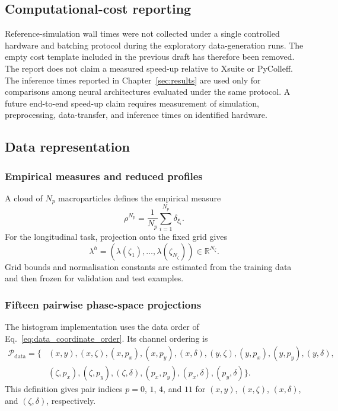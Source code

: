 \subsection{Computational-cost reporting}

Reference-simulation wall times were not collected under a single controlled hardware and batching protocol during the exploratory data-generation runs. The empty cost template included in the previous draft has therefore been removed. The report does not claim a measured speed-up relative to Xsuite or PyColleff. The inference times reported in Chapter~\ref{sec:results} are used only for comparisons among neural architectures evaluated under the same protocol. A future end-to-end speed-up claim requires measurement of simulation, preprocessing, data-transfer, and inference times on identified hardware.

\subsection{Data representation}

\subsubsection{Empirical measures and reduced profiles}

A cloud of $N_p$ macroparticles defines the empirical measure
\begin{equation}
    \rho^{N_p}
    =
    \frac{1}{N_p}
    \sum_{i=1}^{N_p}\delta_{\xi_i}.
\end{equation}
For the longitudinal task, projection onto the fixed grid gives
\begin{equation}
    \lambda^h
    =
    \left(
        \lambda(\zeta_1),\ldots,\lambda(\zeta_{N_{\zeta}})
    \right)
    \in
    \mathbb{R}^{N_{\zeta}}.
\end{equation}
Grid bounds and normalisation constants are estimated from the training data and then frozen for validation and test examples.

\subsubsection{Fifteen pairwise phase-space projections}

The histogram implementation uses the data order of Eq.~\eqref{eq:data_coordinate_order}. Its channel ordering is
\begin{align}
    \mathcal{P}_{\mathrm{data}}
    =\{&
    (x,y),
    (x,\zeta),
    (x,p_x),
    (x,p_y),
    (x,\delta),
    (y,\zeta),
    (y,p_x),
    (y,p_y),
    (y,\delta),
    \nonumber\\
    &
    (\zeta,p_x),
    (\zeta,p_y),
    (\zeta,\delta),
    (p_x,p_y),
    (p_x,\delta),
    (p_y,\delta)
    \}.
    \label{eq:pair_index_order}
\end{align}
This definition gives pair indices $p=0$, $1$, $4$, and $11$ for $(x,y)$, $(x,\zeta)$, $(x,\delta)$, and $(\zeta,\delta)$, respectively.

